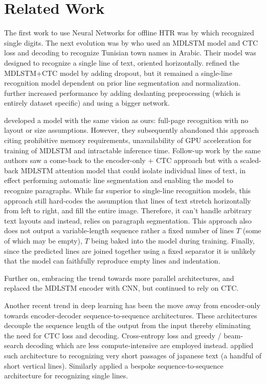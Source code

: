 \documentclass[runningheads]{llncs}
\begin{document}
\section{Related Work}
The first work to use Neural Networks for offline {\small HTR} was by \citet{726791} which recognized single digits. The next evolution was by \citet{Graves2008OfflineHR} who used an {\small MDLSTM} model and {\small CTC} loss and decoding \citep{Graves2006ConnectionistTC} to recognize Tunisian town names in Arabic. Their model was designed to recognize a single line of text, oriented horizontally. \cite{DBLP:journals/corr/PhamKL13} refined the MDLSTM+CTC model by adding dropout, but it remained a single-line recognition model dependent on prior line segmentation and normalization.
\citet{7814068} further increased performance by adding deslanting preprocessing (which is entirely dataset specific) and using a bigger network.

\citet{DBLP:journals/corr/BlucheLM16} developed a model with the same vision as ours: full-page recognition with no layout or size assumptions.
However, they subsequently abandoned this approach citing prohibitive memory requirements, unavailability of GPU acceleration for training of {\small MDLSTM} and intractable inference time.
Follow-up work by the same authors \citep{Bluche2016JointLS,8270042} saw a come-back to the encoder-only + {\small CTC} approach but with a scaled-back {\small MDLSTM} attention model that could isolate individual lines of text, in effect performing automatic line segmentation and enabling the model to recognize paragraphs.
While far superior to single-line recognition models, this approach still hard-codes the assumption that lines of text stretch horizontally from left to right, and fill the entire image.
Therefore, it can't handle arbitrary text layouts and instead, relies on paragraph segmentation.
This approach also does not output a variable-length sequence rather a fixed number of lines $T$ (some of which may be empty), $T$ being baked into the model during training.
Finally, since the predicted lines are joined together using a fixed separator it is unlikely that the model can faithfully reproduce empty lines and indentation.

Further on, embracing the trend towards more parallel architectures, \citet{8270042} and \citet{8269951} replaced the {\small MDLSTM} encoder with {\small CNN}, but continued to rely on {\small CTC}.


Another recent trend in deep learning has been the move away from encoder-only towards encoder-decoder sequence-to-sequence architectures. These architectures decouple the sequence length of the output from the input thereby eliminating the need for {\small CTC} loss and decoding. Cross-entropy loss and greedy / beam-search decoding which are less compute-intensive are employed instead. \citet{8978049} applied such architecture to recognizing very short passages of japanese text (a handful of short vertical lines). Similarly \citet{wang2019decoupled} applied a bespoke sequence-to-sequence architecture for recognizing single lines.
\end{document}
